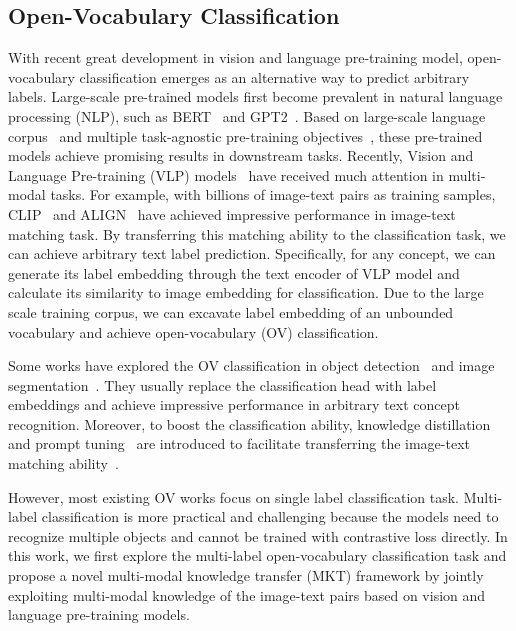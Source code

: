 \documentclass[letterpaper]{article} %
\begin{document}
\subsection{Open-Vocabulary Classification} 
With recent great development in vision and language pre-training model, open-vocabulary  classification emerges as an alternative way to predict arbitrary labels.
Large-scale pre-trained models first become prevalent in natural language processing (NLP), such as BERT~\cite{devlin2018bert} and GPT2~\cite{radford2019language}.
Based on large-scale language corpus~\cite{raffel2020exploring} and multiple task-agnostic pre-training objectives~\cite{devlin2018bert}, these pre-trained models achieve promising results in downstream tasks.
Recently, Vision and Language Pre-training (VLP) models~\cite{ViLBERT, chen2020uniter, li2020unicoder, li2020oscar, kim2021vilt} have received much attention in multi-modal tasks. 
For example, with billions of image-text pairs as training samples, CLIP~\cite{clip} and ALIGN~\cite{align} have achieved impressive performance in image-text matching task.
By transferring this matching ability to the classification task, we can achieve arbitrary text label prediction.
Specifically, for any concept, we can generate its label embedding through the text encoder of VLP model and calculate its similarity to image embedding for classification.
Due to the large scale training corpus, we can excavate label embedding of an unbounded vocabulary and achieve open-vocabulary (OV) classification. \par
Some works have explored the OV classification in object detection~\cite{ovrcnn, openvild, openprompt, openonstage, opendetr} and image segmentation~\cite{opensedo, openseg}. 
They usually replace the classification head with label embeddings and achieve impressive performance in arbitrary text concept recognition. 
Moreover, to boost the classification ability, knowledge distillation~\cite{hinton2015distilling} and prompt tuning~\cite{li2021prefix} are introduced to facilitate transferring the image-text matching ability~\cite{coop}. \par
However, most existing OV works focus on single label classification task.
Multi-label classification is more practical and challenging because the models need to recognize multiple objects and cannot be trained with contrastive loss directly.
In this work, we first explore the multi-label open-vocabulary classification task and propose a novel multi-modal knowledge transfer (MKT) framework by jointly exploiting multi-modal knowledge of the image-text pairs based on vision and language pre-training models.  
\end{document}
